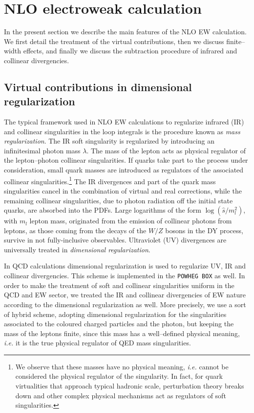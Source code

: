 \documentclass[11pt,a4paper]{article}
\newcommand\POWHEGBOX{\texttt{POWHEG BOX}}
\begin{document}
\section{NLO electroweak calculation}
\label{sec:nlo}

In the present section we describe the main features of the NLO EW
calculation. We first detail the treatment of the virtual
contributions, then we discuss finite--width effects, and finally we
discuss the subtraction procedure of infrared and collinear
divergencies.
\subsection{Virtual contributions in dimensional regularization}
The typical framework used in NLO EW calculations to regularize
infrared (IR) and collinear singularities in the loop integrals is the
procedure known as \emph{mass regularization}. The IR soft singularity
is regularized by introducing an infinitesimal photon mass $\lambda$.
The mass of the lepton acts as physical regulator of the 
lepton--photon collinear singularities.
If quarks take part to the process under consideration, small quark
masses are introduced as regulators of the associated collinear
singularities.\footnote{We observe that these masses have no physical
meaning, {\it i.e.} cannot be considered the physical regulator
of the singularity. In fact, for quark virtualities that approach
typical hadronic scale, perturbation theory breaks down and other
complex physical mechanisms act as regulators of soft singularities.}
The IR divergences and part of the quark mass
singularities cancel in the combination of virtual and real
corrections, while the remaining collinear singularities, due to
photon radiation off the initial state quarks, are absorbed into
the PDFs. Large logarithms of the form $\log(\hat{s}/m_l^2)$, with
$m_l$ lepton mass, originated from the emission of collinear photons
from leptons, as those coming from the decays of the $W/Z$ bosons in
the DY process, survive in not fully-inclusive observables.
Ultraviolet (UV) divergences are universally treated in
\emph{dimensional regularization}.

In QCD calculations dimensional regularization is used to regularize
UV, IR and collinear divergencies. This scheme is implemented in the
\POWHEGBOX{} as well. In order to make the
treatment of soft and collinear singularities uniform in the QCD and
EW sector, we treated the IR and collinear divergencies of EW nature
according to the dimensional regularization as well.  More precisely,
we use a sort of hybrid scheme, adopting dimensional regularization
for the singularities associated to the coloured charged particles and
the photon, but keeping the mass of the leptons finite, since this
mass has a well--defined physical meaning, {\it i.e.} it is the true physical
regulator of QED mass singularities.
\end{document}
